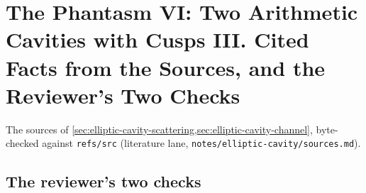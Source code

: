 
\section{The Phantasm VI: Two Arithmetic Cavities with Cusps III. Cited Facts from the Sources, and the Reviewer's Two Checks}
\label{sec:elliptic-cavity-sources}

The sources of \cref{sec:elliptic-cavity-scattering,sec:elliptic-cavity-channel}, byte-checked against
\texttt{refs/src} (literature lane, \texttt{notes/elliptic-cavity/sources.md}).

\subsection{The reviewer's two checks}

